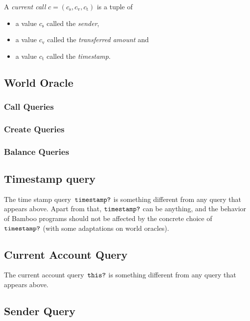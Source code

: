 \documentclass{book}
\begin{document}
A \textit{current call} $c = (c_\mathrm{s}, c_\mathrm{v}, c_\mathrm{t})$ is a tuple of
\begin{itemize}
\item a value $c_\mathrm{s}$ called the \textit{sender},
\item a value $c_\mathrm{v}$ called the \textit{transferred amount} and
\item a value $c_\mathrm{t}$ called the \textit{timestamp}.
\end{itemize}

\subsection{World Oracle}

\subsubsection{Call Queries}

\subsubsection{Create Queries}

\subsubsection{Balance Queries}

\subsection{Timestamp query}

\newcommand{\timestampQuery}{\text{\texttt{timestamp?}}}
The time stamp query~$\timestampQuery$ is something different from any query that appears above. Apart from that, $\timestampQuery$ can be anything, and the behavior of Bamboo programs should not be affected by the concrete choice of $\timestampQuery$ (with some adaptations on world oracles).

\subsection{Current Account Query}

\newcommand{\thisQuery}[0]{\text{\texttt{this?}}}

The current account query~$\thisQuery$ is something different from any query that appears above.

\subsection{Sender Query}
\end{document}
